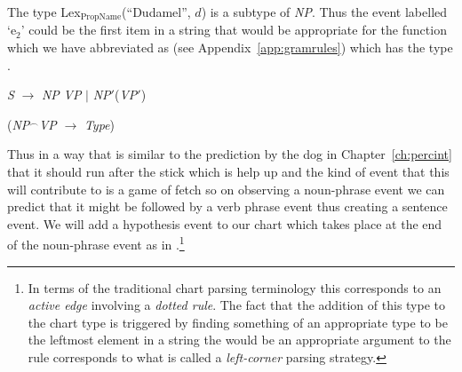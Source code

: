 The type Lex$_{\mathrm{PropName}}$(``Dudamel'', $d$) is a subtype of
\textit{NP}.  Thus the event labelled `e$_2$' could be the first item
in a string that would be appropriate for the function which we have
abbreviated as  (see Appendix~\ref{app:gramrules}) which has the type .
\begin{ex} 
\begin{subex} 
 
\item \textit{S} $\longrightarrow$ \textit{NP} \textit{VP} $\mid$
\textit{NP}$'$(\textit{VP}$'$) 
 
\item (\textit{NP}$^{\frown}$\textit{VP} $\rightarrow$ \textit{Type}) 
 
\end{subex} 
   
\end{ex} 
Thus in a way that is similar to the prediction by the dog in
Chapter~\ref{ch:percint} that it should run after the stick which is
help up and the
kind of event that this will contribute to is a game of fetch so on
observing a noun-phrase event we can predict that it might be followed
by a verb phrase event thus creating a sentence event.  We will add a
hypothesis event to our chart which takes place at the end of the
noun-phrase event as in \nexteg{}.\footnote{In terms of the traditional chart parsing
  terminology this corresponds to an \textit{active edge} involving a
  \textit{dotted rule}.  The fact that the addition of this type to
  the chart type is triggered by finding something of an appropriate
  type to be the leftmost element in a string the would be an
  appropriate argument to the rule corresponds to what is called a
  \textit{left-corner} parsing strategy.} 
